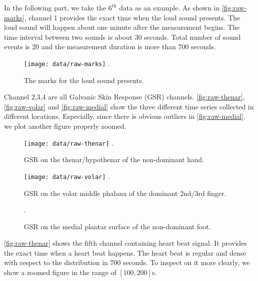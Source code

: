 \documentclass[]{article}
\begin{document}
In the following part, we take the $6^{\mathrm{th}}$ data as an example. As shown in \autoref{fig:raw-marks}, channel 1 provides the exact time when the loud sound presents. The loud sound will happen about one minute after the measurement begins. The time interval between two sounds is about 30 seconds. Total number of sound events is 20 and the measurement duration is more than 700 seconds. 

\begin{figure}[htbp]
  \centering
  \texttt{[image: data/raw-marks]}
  \DeclareGraphicsExtensions.
  \caption{The marks for the loud sound presents.} \label{fig:raw-marks}
\end{figure}

Channel 2,3,4 are all Galvanic Skin Response (GSR) channels. \autoref{fig:raw-thenar}, \autoref{fig:raw-volar} and \autoref{fig:raw-medial} show the three different time series collected in different locations. Especially, since there is obvious outliers in \autoref{fig:raw-medial}, we plot another figure properly zoomed.

\begin{figure}[htbp]
  \centering
  \texttt{[image: data/raw-thenar]}
  \DeclareGraphicsExtensions.
  \caption{GSR on the thenar/hypothenar of the non-dominant hand.} \label{fig:raw-thenar}
\end{figure}

\begin{figure}[htbp]
  \centering
  \texttt{[image: data/raw-volar]}
  \DeclareGraphicsExtensions.
  \caption{GSR on the volar middle phalanx of the dominant 2nd/3rd finger.} \label{fig:raw-volar}
\end{figure}

\begin{figure}[htbp]
  \centering
  \DeclareGraphicsExtensions.
  \caption{GSR on the medial plantar surface of the non-dominant foot.} \label{fig:raw-medial}
\end{figure}

\autoref{fig:raw-thenar} shows the fifth channel containing heart beat signal. It provides the exact time when a heart beat happens. The heart beat is regular and dense with respect to the distribution in 700 seconds. To inspect on it more clearly, we show a zoomed figure in the range of $[100,200]\mathrm{s}$.
\end{document}
